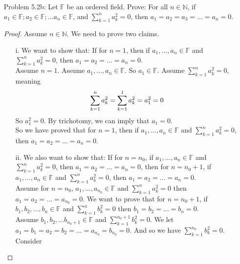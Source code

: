 \documentclass{article}
\theoremstyle{claim}
\theoremstyle{definition}
\begin{document}
\begin{enumerate}
    \item[Problem 5.2b:] Let $\mathbb{F}$ be an ordered field. Prove: For all $n \in \mathbb{N}$, if $a_1 \in \mathbb{F}; a_2 \in \mathbb{F}; ... a_n \in \mathbb{F}$, and $\sum\limits_{k=1}^n a_k^2 = 0$, then $a_1 = a_2 = a_3 = ... = a_n = 0$.
            \begin{proof}
                Assume $n \in \mathbb{N}$. We need to prove two claims.
                \begin{enumerate}
                    \item[i.] We want to show that: If for $n = 1$, then if $a_1, ..., a_n \in \mathbb{F}$ and $\sum\limits_{k=1}^n a_k^2 = 0$, then $a_1 = a_2 = ... = a_n = 0$.\\
                        Assume $n = 1$. Assume $a_1, ..., a_n \in \mathbb{F}$. So $a_1 \in \mathbb{F}$. Assume $\sum\limits_{k=1}^n a_k^2 = 0$, meaning
                        \begin{equation*}
                            \sum\limits_{k=1}^n a_k^2 = \sum\limits_{k=1}^1 a_k^2 = a_1^2 = 0\\
                        \end{equation*}
                        So $a_1^2 = 0$. By trichotomy, we can imply that $a_1 = 0$.\\
                        So we have proved that for $n = 1$, then if $a_1, ..., a_n \in \mathbb{F}$ and $\sum\limits_{k=1}^n a_k^2 = 0$, then $a_1 = a_2 = ... = a_n = 0$.\\
                    \item[ii.] We also want to show that: If for $n = n_0$, if $a_1, ..., a_n \in \mathbb{F}$ and $\sum\limits_{k=1}^n a_k^2 = 0$, then $a_1 = a_2 = ... = a_n = 0$, then for $n = n_0 + 1$, if $a_1, ..., a_n \in \mathbb{F}$ and $\sum\limits_{k=1}^n a_k^2 = 0$, then $a_1 = a_2 = ... = a_n = 0$.\\
                        Assume for $n = n_0$, $a_1, ..., a_{n_0} \in \mathbb{F}$ and $\sum\limits_{k=1}^n a_k^2 = 0$ then $a_1 = a_2 = ... = a_{n_0} = 0$. We want to prove that for $n = n_0 + 1$, if $b_1, b_2, ..., b_n \in \mathbb{F}$ and $\sum\limits_{k=1}^n b_k^2 = 0$ then $b_1 = b_2 = ... = b_n = 0$.\\
                        Assume $b_1, b_2, ... b_{n_0 + 1} \in \mathbb{F}$ and $\sum\limits_{k=1}^{n_0 + 1} b_k^2 = 0$. We let $a_1 = b_1 = a_2 = b_2 = ...= a_{n_0} = b_{n_0} = 0$. And so we have $\sum\limits_{k=1}^{n_0} b_k^2 = 0$. Consider

\end{enumerate}
\end{proof}
\end{enumerate}
\end{document}
